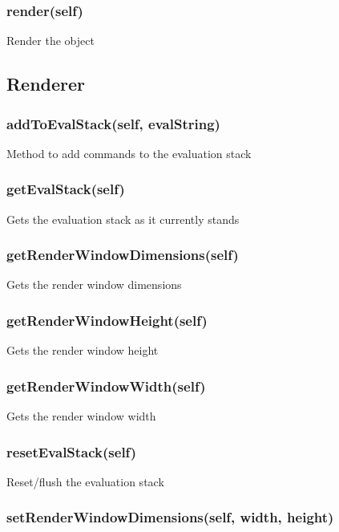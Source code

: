\subsubsection{render(self)}

Render the object

\subsection{Renderer}

\subsubsection{addToEvalStack(self, evalString)}

Method to add commands to the evaluation stack

\subsubsection{getEvalStack(self)}

Gets the evaluation stack as it currently stands

\subsubsection{getRenderWindowDimensions(self)}

Gets the render window dimensions

\subsubsection{getRenderWindowHeight(self)}

Gets the render window height

\subsubsection{getRenderWindowWidth(self)}

Gets the render window width

\subsubsection{resetEvalStack(self)}

Reset/flush the evaluation stack

\subsubsection{setRenderWindowDimensions(self, width, height)}

